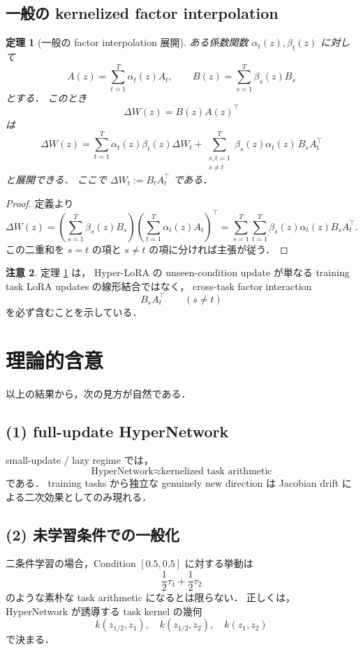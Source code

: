 \documentclass[a4paper,11pt]{bxjsarticle}
\newtheorem{theorem}{定理}[section]
\theoremstyle{definition}
\newtheorem{remark}[theorem]{注意}
\begin{document}
\subsection{一般の kernelized factor interpolation}

\begin{theorem}[一般の factor interpolation 展開]
\label{thm:general-factor-expansion}
ある係数関数 $\alpha_t(z),\beta_t(z)$ に対して
\[
A(z)=\sum_{t=1}^T \alpha_t(z)A_t,\qquad
B(z)=\sum_{s=1}^T \beta_s(z)B_s
\]
とする．
このとき
\[
\Delta W(z)=B(z)A(z)^\top
\]
は
\[
\boxed{
\Delta W(z)
=
\sum_{t=1}^T \alpha_t(z)\beta_t(z)\Delta W_t
+
\sum_{\substack{s,t=1\\ s\neq t}}^T \beta_s(z)\alpha_t(z)\,B_sA_t^\top
}
\]
と展開できる．
ここで $\Delta W_t:=B_tA_t^\top$ である．
\end{theorem}

\begin{proof}
定義より
\[
\Delta W(z)
=
\left(\sum_{s=1}^T \beta_s(z)B_s\right)
\left(\sum_{t=1}^T \alpha_t(z)A_t\right)^\top
=
\sum_{s=1}^T\sum_{t=1}^T \beta_s(z)\alpha_t(z)B_sA_t^\top.
\]
この二重和を $s=t$ の項と $s\neq t$ の項に分ければ主張が従う．
\end{proof}

\begin{remark}
定理 \ref{thm:general-factor-expansion} は，
Hyper-LoRA の unseen-condition update が単なる training task LoRA updates の線形結合ではなく，
cross-task factor interaction
\[
B_sA_t^\top\qquad (s\neq t)
\]
を必ず含むことを示している．
\end{remark}

\section{理論的含意}

以上の結果から，次の見方が自然である．

\subsection*{(1) full-update HyperNetwork}
small-update / lazy regime では，
\[
\text{HyperNetwork} \approx \text{kernelized task arithmetic}
\]
である．
training tasks から独立な genuinely new direction は Jacobian drift による二次効果としてのみ現れる．

\subsection*{(2) 未学習条件での一般化}
二条件学習の場合，Condition $[0.5,0.5]$ に対する挙動は
\[
\frac12\tau_1+\frac12\tau_2
\]
のような素朴な task arithmetic になるとは限らない．
正しくは，HyperNetwork が誘導する task kernel の幾何
\[
k(z_{1/2},z_1),\quad k(z_{1/2},z_2),\quad k(z_1,z_2)
\]
で決まる．
\end{document}

